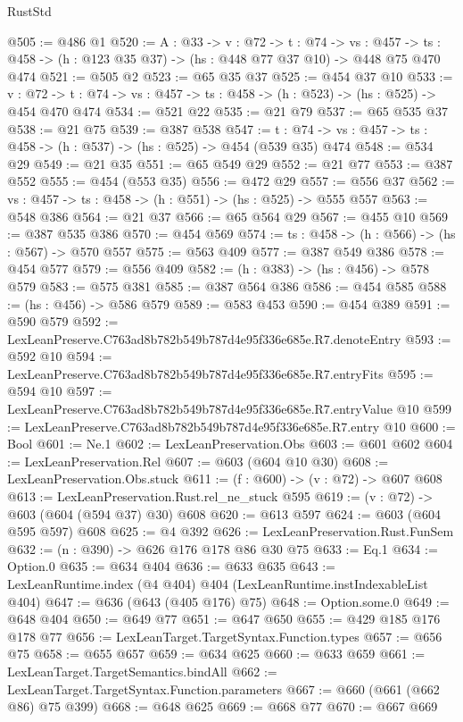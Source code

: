 \begin{lexlean}{RustStd}
\begin{coremodule}
@505 := @486 @1
@520 := {A : @33} ->
  {v : @72} ->
  {t : @74} ->
  {vs : @457} -> {ts : @458} -> (h : @123 @35 @37) -> (hs : @448 @77 @37 @10) -> @448 @75 @470 @474
@521 := @505 @2
@523 := @65 @35 @37
@525 := @454 @37 @10
@533 := {v : @72} ->
  {t : @74} -> {vs : @457} -> {ts : @458} -> (h : @523) -> (hs : @525) -> @454 @470 @474
@534 := @521 @22
@535 := @21 @79
@537 := @65 @535 @37
@538 := @21 @75
@539 := @387 @538
@547 := {t : @74} -> {vs : @457} -> {ts : @458} -> (h : @537) -> (hs : @525) -> @454 (@539 @35) @474
@548 := @534 @29
@549 := @21 @35
@551 := @65 @549 @29
@552 := @21 @77
@553 := @387 @552
@555 := @454 (@553 @35)
@556 := @472 @29
@557 := @556 @37
@562 := {vs : @457} -> {ts : @458} -> (h : @551) -> (hs : @525) -> @555 @557
@563 := @548 @386
@564 := @21 @37
@566 := @65 @564 @29
@567 := @455 @10
@569 := @387 @535 @386
@570 := @454 @569
@574 := {ts : @458} -> (h : @566) -> (hs : @567) -> @570 @557
@575 := @563 @409
@577 := @387 @549 @386
@578 := @454 @577
@579 := @556 @409
@582 := (h : @383) -> (hs : @456) -> @578 @579
@583 := @575 @381
@585 := @387 @564 @386
@586 := @454 @585
@588 := (hs : @456) -> @586 @579
@589 := @583 @453
@590 := @454 @389
@591 := @590 @579
@592 := LexLeanPreserve.C763ad8b782b549b787d4e95f336e685e.R7.denoteEntry
@593 := @592 @10
@594 := LexLeanPreserve.C763ad8b782b549b787d4e95f336e685e.R7.entryFits
@595 := @594 @10
@597 := LexLeanPreserve.C763ad8b782b549b787d4e95f336e685e.R7.entryValue @10
@599 := LexLeanPreserve.C763ad8b782b549b787d4e95f336e685e.R7.entry @10
@600 := Bool
@601 := Ne.{1}
@602 := LexLeanPreservation.Obs
@603 := @601 @602
@604 := LexLeanPreservation.Rel
@607 := @603 (@604 @10 @30)
@608 := LexLeanPreservation.Obs.stuck
@611 := (f : @600) -> (v : @72) -> @607 @608
@613 := LexLeanPreservation.Rust.rel_ne_stuck @595
@619 := (v : @72) -> @603 (@604 (@594 @37) @30) @608
@620 := @613 @597
@624 := @603 (@604 @595 @597) @608
@625 := @4 @392
@626 := LexLeanPreservation.Rust.FunSem
@632 := (n : @390) -> @626 @176 @178 @86 @30 @75
@633 := Eq.{1}
@634 := Option.{0}
@635 := @634 @404
@636 := @633 @635
@643 := LexLeanRuntime.index (@4 @404) @404 (LexLeanRuntime.instIndexableList @404)
@647 := @636 (@643 (@405 @176) @75)
@648 := Option.some.{0}
@649 := @648 @404
@650 := @649 @77
@651 := @647 @650
@655 := @429 @185 @176 @178 @77
@656 := LexLeanTarget.TargetSyntax.Function.types
@657 := @656 @75
@658 := @655 @657
@659 := @634 @625
@660 := @633 @659
@661 := LexLeanTarget.TargetSemantics.bindAll
@662 := LexLeanTarget.TargetSyntax.Function.parameters
@667 := @660 (@661 (@662 @86) @75 @399)
@668 := @648 @625
@669 := @668 @77
@670 := @667 @669

\end{coremodule}
\end{lexlean}
